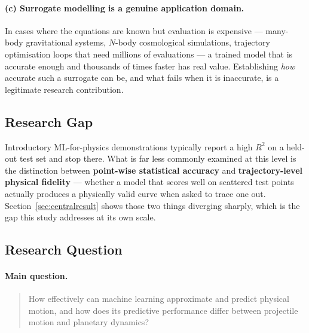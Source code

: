 \documentclass[11pt,a4paper]{article}
\newcommand{\Rsq}{R^{2}}
\begin{document}
\paragraph{(c) Surrogate modelling is a genuine application domain.}
In cases where the equations are known but evaluation is expensive --- many-body gravitational
systems, $N$-body cosmological simulations, trajectory optimisation loops that need millions of
evaluations --- a trained model that is accurate enough and thousands of times faster has real
value. Establishing \emph{how} accurate such a surrogate can be, and what fails when it is
inaccurate, is a legitimate research contribution.

\subsection{Research Gap}

Introductory ML-for-physics demonstrations typically report a high $\Rsq$ on a held-out test set
and stop there. What is far less commonly examined at this level is the distinction between
\textbf{point-wise statistical accuracy} and \textbf{trajectory-level physical fidelity} ---
whether a model that scores well on scattered test points actually produces a physically valid
curve when asked to trace one out. Section~\ref{sec:centralresult} shows those two things diverging
sharply, which is the gap this study addresses at its own scale.

\subsection{Research Question}\label{sec:rq}

\paragraph{Main question.}
\begin{quote}
How effectively can machine learning approximate and predict physical motion, and how does its
predictive performance differ between projectile motion and planetary dynamics?
\end{quote}
\end{document}
